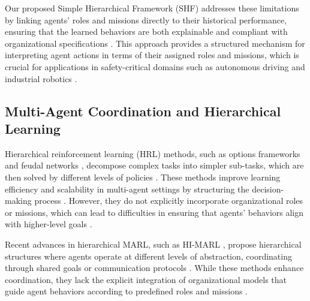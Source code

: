 \documentclass[sigconf,anonymous]{aamas}
\begin{document}

Our proposed Simple Hierarchical Framework (SHF) addresses these limitations by linking agents' roles and missions directly to their historical performance, ensuring that the learned behaviors are both explainable and compliant with organizational specifications \cite{hubner2010moise}. This approach provides a structured mechanism for interpreting agent actions in terms of their assigned roles and missions, which is crucial for applications in safety-critical domains such as autonomous driving and industrial robotics \cite{su2021toward}.


\subsection{Multi-Agent Coordination and Hierarchical Learning}
Hierarchical reinforcement learning (HRL) methods, such as options frameworks \cite{options_hrl_reference} and feudal networks \cite{feudal_rl_reference}, decompose complex tasks into simpler sub-tasks, which are then solved by different levels of policies \cite{foerster2018counterfactual, yang2018mean}. These methods improve learning efficiency and scalability in multi-agent settings by structuring the decision-making process \cite{yang2018mean}. However, they do not explicitly incorporate organizational roles or missions, which can lead to difficulties in ensuring that agents' behaviors align with higher-level goals \cite{hernandez2019survey, hubner2010moise}.


Recent advances in hierarchical MARL, such as HI-MARL \cite{hi_marl_reference}, propose hierarchical structures where agents operate at different levels of abstraction, coordinating through shared goals or communication protocols \cite{foerster2018counterfactual}. While these methods enhance coordination, they lack the explicit integration of organizational models that guide agent behaviors according to predefined roles and missions \cite{hubner2010moise, soule2024}.
\end{document}
